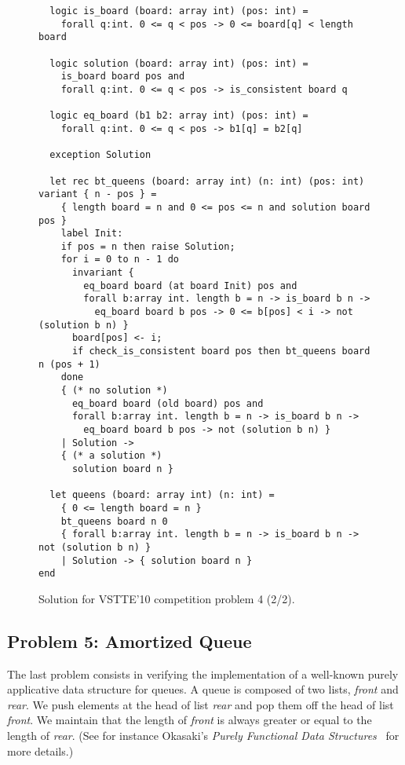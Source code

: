 \begin{figure}
  \centering
\begin{verbatim}
  logic is_board (board: array int) (pos: int) =
    forall q:int. 0 <= q < pos -> 0 <= board[q] < length board

  logic solution (board: array int) (pos: int) =
    is_board board pos and
    forall q:int. 0 <= q < pos -> is_consistent board q

  logic eq_board (b1 b2: array int) (pos: int) =
    forall q:int. 0 <= q < pos -> b1[q] = b2[q]

  exception Solution

  let rec bt_queens (board: array int) (n: int) (pos: int) variant { n - pos } =
    { length board = n and 0 <= pos <= n and solution board pos }
    label Init:
    if pos = n then raise Solution;
    for i = 0 to n - 1 do
      invariant {
        eq_board board (at board Init) pos and
        forall b:array int. length b = n -> is_board b n ->
          eq_board board b pos -> 0 <= b[pos] < i -> not (solution b n) }
      board[pos] <- i;
      if check_is_consistent board pos then bt_queens board n (pos + 1)
    done
    { (* no solution *)
      eq_board board (old board) pos and
      forall b:array int. length b = n -> is_board b n ->
        eq_board board b pos -> not (solution b n) }
    | Solution ->
    { (* a solution *)
      solution board n }

  let queens (board: array int) (n: int) =
    { 0 <= length board = n }
    bt_queens board n 0
    { forall b:array int. length b = n -> is_board b n -> not (solution b n) }
    | Solution -> { solution board n }
end
\end{verbatim}
\vspace*{-2em}\hrulefill
  \caption{Solution for VSTTE'10 competition problem 4 (2/2).}
  \label{fig:NQueens2}
\end{figure}


\subsection{Problem 5: Amortized Queue}

The last problem consists in verifying the implementation of a
well-known purely applicative data structure for queues.
A queue is composed of two lists, \textit{front} and \textit{rear}.
We push elements at the head of list \textit{rear} and pop them off
the head of list \textit{front}. We maintain that the length of
\textit{front} is always greater or equal to the length of \textit{rear}.
(See for instance Okasaki's \emph{Purely Functional Data
  Structures}~\cite{okasaki98} for more details.)

